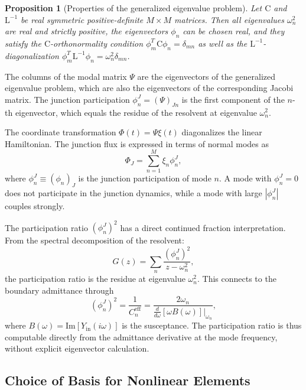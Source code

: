 \documentclass[reprint, floatfix, superscriptaddress, amsmath, amssymb, longbibliography]{revtex4-2}
\newtheorem{proposition}[theorem]{Proposition}
\newcommand{\Yin}{Y_{\mathrm{in}}}
\begin{document}
\begin{proposition}[Properties of the generalized eigenvalue problem]
\label{prop:gep_properties}
Let $\mathrm{C}$ and $\mathrm{L}^{-1}$ be real symmetric positive-definite $M \times M$ matrices. Then all eigenvalues $\omega_n^2$ are real and strictly positive, the eigenvectors ${\phi}_n$ can be chosen real, and they satisfy the $\mathrm{C}$-orthonormality condition ${\phi}_m^T \mathrm{C} {\phi}_n = \delta_{mn}$ as well as the $\mathrm{L}^{-1}$-diagonalization ${\phi}_m^T \mathrm{L}^{-1} {\phi}_n = \omega_n^2 \delta_{mn}$.
\end{proposition}

The columns of the modal matrix $\Psi$ are the eigenvectors of the generalized eigenvalue problem, which are also the eigenvectors of the corresponding Jacobi matrix. The junction participation $\phi_n^J = (\Psi)_{Jn}$ is the first component of the $n$-th eigenvector, which equals the residue of the resolvent at eigenvalue $\omega_n^2$.

The coordinate transformation ${\Phi}(t) = \Psi {\xi}(t)$ diagonalizes the linear Hamiltonian. The junction flux is expressed in terms of normal modes as
\begin{equation}
\Phi_J = \sum_{n=1}^{M} \xi_n \phi_n^J,
\label{eq:Phi_J_modes}
\end{equation}
where $\phi_n^J \equiv ({\phi}_n)_J$ is the junction participation of mode $n$. A mode with $\phi_n^J = 0$ does not participate in the junction dynamics, while a mode with large $|\phi_n^J|$ couples strongly.

The participation ratio $(\phi_n^J)^2$ has a direct continued fraction interpretation. From the spectral decomposition of the resolvent:
\begin{equation}
G(z) = \sum_n \frac{(\phi_n^J)^2}{z - \omega_n^2},
\end{equation}
the participation ratio is the residue at eigenvalue $\omega_n^2$. This connects to the boundary admittance through~\cite{Nigg2012,Minev2021}
\begin{equation}
(\phi_n^J)^2 = \frac{1}{C_n^{\mathrm{eff}}} = \frac{2\omega_n}{\frac{d}{d\omega}[\omega B(\omega)]|_{\omega_n}},
\label{eq:participation_from_Y}
\end{equation}
where $B(\omega) = \mathrm{Im}[\Yin(i\omega)]$ is the susceptance. The participation ratio is thus computable directly from the admittance derivative at the mode frequency, without explicit eigenvector calculation.


\subsection{Choice of Basis for Nonlinear Elements}
\label{sec:basis_choice}
\end{document}
